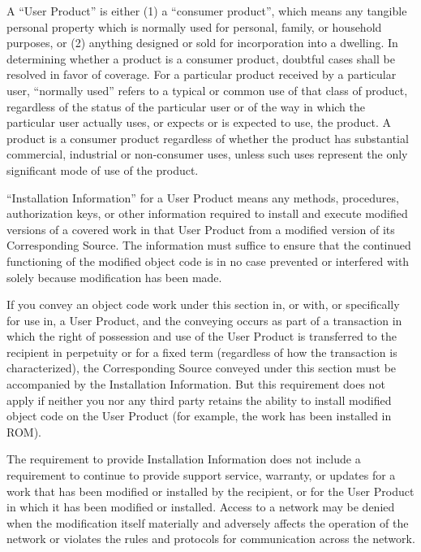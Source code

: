 \documentclass[10pt,english]{article}
\begin{document}
A \textquotedblleft{}User Product\textquotedblright{} is either (1)
a \textquotedblleft{}consumer product\textquotedblright{}, which means
any tangible personal property which is normally used for personal,
family, or household purposes, or (2) anything designed or sold for
incorporation into a dwelling. In determining whether a product is
a consumer product, doubtful cases shall be resolved in favor of coverage.
For a particular product received by a particular user, \textquotedblleft{}normally
used\textquotedblright{} refers to a typical or common use of that
class of product, regardless of the status of the particular user
or of the way in which the particular user actually uses, or expects
or is expected to use, the product. A product is a consumer product
regardless of whether the product has substantial commercial, industrial
or non-consumer uses, unless such uses represent the only significant
mode of use of the product.

\textquotedblleft{}Installation Information\textquotedblright{} for
a User Product means any methods, procedures, authorization keys,
or other information required to install and execute modified versions
of a covered work in that User Product from a modified version of
its Corresponding Source. The information must suffice to ensure that
the continued functioning of the modified object code is in no case
prevented or interfered with solely because modification has been
made.

If you convey an object code work under this section in, or with,
or specifically for use in, a User Product, and the conveying occurs
as part of a transaction in which the right of possession and use
of the User Product is transferred to the recipient in perpetuity
or for a fixed term (regardless of how the transaction is characterized),
the Corresponding Source conveyed under this section must be accompanied
by the Installation Information. But this requirement does not apply
if neither you nor any third party retains the ability to install
modified object code on the User Product (for example, the work has
been installed in ROM).

The requirement to provide Installation Information does not include
a requirement to continue to provide support service, warranty, or
updates for a work that has been modified or installed by the recipient,
or for the User Product in which it has been modified or installed.
Access to a network may be denied when the modification itself materially
and adversely affects the operation of the network or violates the
rules and protocols for communication across the network.
\end{document}

